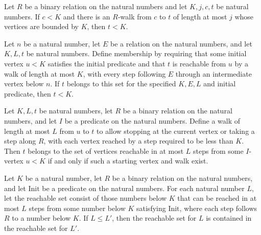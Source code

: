 \begin{lemma}
\label{Complexity.LogProg.ISCount.walkLe_lt}
\leanok
{}
Let $R$ be a binary relation on the natural numbers and let $K,j,c,t$ be natural
numbers. If $c<K$ and there is an $R$-walk from $c$ to $t$ of length at most $j$ whose
vertices are bounded by $K$, then $t<K$.
\end{lemma}

\begin{lemma}
\label{Complexity.LogProg.ISCount.Mem.lt}
\leanok
{}
Let $n$ be a natural number, let $E$ be a relation on the natural numbers, and let
$K,L,t$ be natural numbers. Define membership by requiring that some initial vertex
$u<K$ satisfies the initial predicate and that $t$ is reachable from $u$ by a walk of
length at most $K$, with every step following $E$ through an intermediate vertex below
$n$. If $t$ belongs to this set for the specified $K,E,L$ and initial predicate, then
$t<K$.
\end{lemma}

\begin{lemma}
\label{Complexity.LogProg.ISCount.mem_ball}
\leanok
{}
Let $K,L,t$ be natural numbers, let $R$ be a binary relation on the natural numbers, and
let $I$ be a predicate on the natural numbers. Define a walk of length at most $L$ from
$u$ to $t$ to allow stopping at the current vertex or taking a step along $R$, with each
vertex reached by a step required to be less than $K$. Then $t$ belongs to the set of
vertices reachable in at most $L$ steps from some $I$-vertex $u<K$ if and only if such a
starting vertex and walk exist.
\end{lemma}

\begin{lemma}
\label{Complexity.LogProg.ISCount.ball_mono}
\leanok
{}
Let $K$ be a natural number, let $R$ be a binary relation on the natural numbers, and
let $\text{Init}$ be a predicate on the natural numbers. For each natural number $L$, let
the reachable set consist of those numbers below $K$ that can be reached in at most $L$
steps from some number below $K$ satisfying $\text{Init}$, where each step follows $R$ to
a number below $K$. If $L \le L'$, then the reachable set for $L$ is contained in the
reachable set for $L'$.
\end{lemma}

